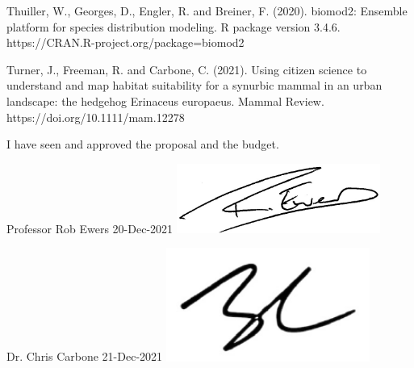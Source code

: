 \documentclass[11pt, a4paper]{article}
\begin{document}
Thuiller, W., Georges, D., Engler, R. and Breiner, F. (2020). biomod2: Ensemble platform for species distribution modeling. R package version 3.4.6. https://CRAN.R-project.org/package=biomod2

Turner, J., Freeman, R. and Carbone, C. (2021). Using citizen science to understand and map habitat suitability for a synurbic mammal in an urban landscape: the hedgehog Erinaceus europaeus. Mammal Review. https://doi.org/10.1111/mam.12278


\newpage
I have seen and approved the proposal and the budget.

Professor Rob Ewers 20-Dec-2021
  \includegraphics[width=0.5\textwidth]{RE_sign.pdf}
  
Dr. Chris Carbone 21-Dec-2021
  \includegraphics[width=0.5\textwidth]{CC_sign.pdf}
\end{document}

